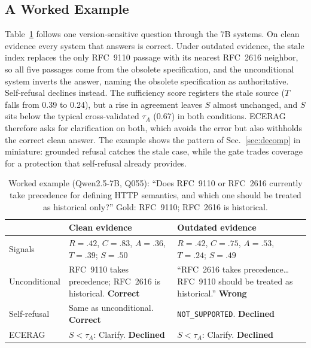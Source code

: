 \documentclass[conference,letterpaper]{IEEEtran}
\newcommand{\tA}{\tau_A}
\begin{document}
\subsection{A Worked Example}\label{sec:example}
Table~\ref{tab:example} follows one version-sensitive question through the 7B systems. On clean
evidence every system that answers is correct. Under outdated evidence, the stale index replaces
the only RFC~9110 passage with its nearest RFC~2616 neighbor, so all five passages come from the
obsolete specification, and the unconditional system inverts the answer,
naming the obsolete specification as authoritative. Self-refusal declines instead. The
sufficiency score registers the stale source ($T$ falls from 0.39 to 0.24), but a rise in
agreement leaves $S$ almost unchanged, and $S$ sits below the typical cross-validated $\tA$ (0.67)
in both conditions. ECERAG therefore asks for clarification on both, which avoids the error but
also withholds the correct clean answer. The example shows the pattern of Sec.~\ref{sec:decomp}
in miniature: grounded refusal catches the stale case, while the gate trades coverage for a
protection that self-refusal already provides.

\begin{table}[t]
\caption{Worked example (Qwen2.5-7B, Q055): ``Does RFC~9110 or RFC~2616 currently take precedence
for defining HTTP semantics, and which one should be treated as historical only?'' Gold:
RFC~9110; RFC~2616 is historical.}
\label{tab:example}
\centering
\footnotesize
\setlength{\tabcolsep}{3pt}
\begin{tabular}{p{}p{}p{}}
\toprule
& Clean evidence & Outdated evidence\\
\midrule
Signals & $R{=}.42$, $C{=}.83$, $A{=}.36$, $T{=}.39$; $S{=}.50$ & $R{=}.42$, $C{=}.75$, $A{=}.53$, $T{=}.24$; $S{=}.49$\\
Unconditional & RFC~9110 takes precedence; RFC~2616 is historical. \textbf{Correct} & ``RFC~2616 takes precedence\ldots{} RFC~9110 should be treated as historical.'' \textbf{Wrong}\\
Self-refusal & Same as unconditional. \textbf{Correct} & \texttt{NOT\_SUPPORTED}. \textbf{Declined}\\
ECERAG & $S<\tA$: Clarify. \textbf{Declined} & $S<\tA$: Clarify. \textbf{Declined}\\
\bottomrule
\end{tabular}
\end{table}
\end{document}
